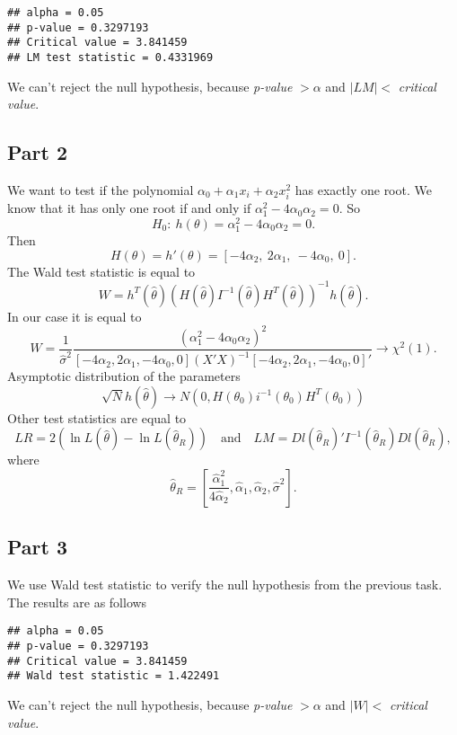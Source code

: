 \documentclass[12pt, a4paper]{article}\usepackage[]{graphicx}\usepackage[]{color}
\makeatletter
\newenvironment{kframe}{%
 \def\at@end@of@kframe{}%
 \ifinner\ifhmode%
  \def\at@end@of@kframe{\end{minipage}}%
  \begin{minipage}{\columnwidth}%
 \fi\fi%
 \def\FrameCommand##1{\hskip\@totalleftmargin \hskip-\fboxsep
 \colorbox{shadecolor}{##1}\hskip-\fboxsep
     \hskip-\linewidth \hskip-\@totalleftmargin \hskip\columnwidth}%
 \MakeFramed {\advance\hsize-\width
   \@totalleftmargin\z@ \linewidth\hsize
   \@setminipage}}%
 {\par\unskip\endMakeFramed%
 \at@end@of@kframe}
\newenvironment{knitrout}{}{} %
\makeatother
\begin{document}
\begin{knitrout}
\color{fgcolor}\begin{kframe}
\begin{verbatim}
## alpha = 0.05
## p-value = 0.3297193
## Critical value = 3.841459
## LM test statistic = 0.4331969
\end{verbatim}
\end{kframe}
\end{knitrout}
We can't reject the null hypothesis, because \textit{p-value} $> \alpha$ and $|LM|<$ \textit{critical value}.


\subsection{Part 2}
We want to test if the polynomial $\alpha_0 + \alpha_1 x_i + \alpha_2 x_i^2 $ has exactly one root. We know that it has only one root if and only if 
$ \alpha_1^2 - 4\alpha_0 \alpha_2 = 0$.
So
\[ H_0:\ h(\theta) = \alpha_1^2 - 4\alpha_0 \alpha_2 = 0. \]
Then 
\[ H(\theta) = h'(\theta) = [-4\alpha_2,\ 2\alpha_1,\ -4\alpha_0,\ 0]. \]
The Wald test statistic is equal to
\[ W = h^T(\hat{\theta}) \left( H(\hat{\theta}) I^{-1}(\hat{\theta}) H^T(\hat{\theta}) \right)^{-1} h(\hat{\theta}). \]
In our case it is equal to
\[ W = \frac{1}{\hat{\sigma}^2} \frac{(\alpha_1^2 - 4\alpha_0 \alpha_2)^2}
      { [-4\alpha_2, 2\alpha_1, -4\alpha_0, 0] (X'X)^{-1} [-4\alpha_2, 2\alpha_1, -4\alpha_0, 0]' } \rightarrow \chi^2(1). \]
Asymptotic distribution of the parameters
\[ \sqrt{N} h(\hat{\theta}) \rightarrow N\left(0, H(\theta_0)  i^{-1}(\theta_0) H^T(\theta_0) \right) \]
Other test statistics are equal to
\[ LR = 2\left( \ln{L(\hat{\theta})} - \ln{L(\hat{\theta}_R)} \right) \quad\text{and}\quad LM = Dl(\hat{\theta}_R)' I^{-1}(\hat{\theta}_R) Dl(\hat{\theta}_R), \]
where 
\[\hat{\theta}_R = \left [\frac{\hat{\alpha}_1^2}{4\hat{\alpha}_2}, \hat{\alpha}_1, \hat{\alpha}_2, \hat{\sigma}^2 \right]. \]


\subsection{Part 3}
We use Wald test statistic to verify the null hypothesis from the previous task. The results are as follows
\begin{knitrout}
\color{fgcolor}\begin{kframe}
\begin{verbatim}
## alpha = 0.05
## p-value = 0.3297193
## Critical value = 3.841459
## Wald test statistic = 1.422491
\end{verbatim}
\end{kframe}
\end{knitrout}
We can't reject the null hypothesis, because \textit{p-value} $> \alpha$ and $|W|<$ \textit{critical value}.
\end{document}
